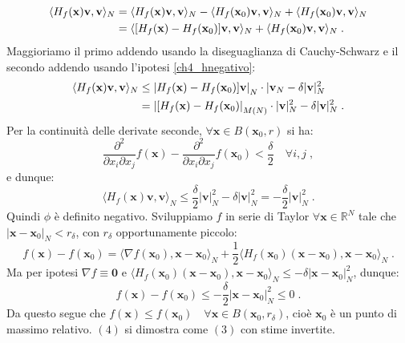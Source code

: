 \documentclass[a4paper,12pt]{report}
\theoremstyle{plain}
\theoremstyle{definition}
\theoremstyle{remark}
\numberwithin{equation}{section}
\begin{document}
\begin{align}
\langle H_f(\mathbf{x})\mathbf{v},\mathbf{v}\rangle_N &= \langle H_f(\mathbf{x})\mathbf{v},\mathbf{v}\rangle_N-\langle H_f(\mathbf{x}_0)\mathbf{v},\mathbf{v}\rangle_N+\langle H_f(\mathbf{x}_0)\mathbf{v},\mathbf{v}\rangle_N \notag \\
&=\langle [H_f(\mathbf{x})-H_f(\mathbf{x}_0)]\mathbf{v},\mathbf{v}\rangle_N+\langle H_f(\mathbf{x}_0)\mathbf{v},\mathbf{v}\rangle_N\;.
\end{align}
Maggioriamo il primo addendo usando la diseguaglianza di Cauchy-Schwarz e il secondo addendo usando l'ipotesi \eqref{ch4_hnegativo}:
\begin{align}
\langle H_f(\mathbf{x})\mathbf{v},\mathbf{v}\rangle_N &\le \left|H_f(\mathbf{x})-H_f(\mathbf{x}_0)]\mathbf{v}\right|_N\cdot |\mathbf{v}_N-\delta|\mathbf{v}|_N^2 \notag \\
&= \left|[H_f(\mathbf{x})-H_f(\mathbf{x}_0)\right|_{M(N)}\cdot |\mathbf{v}|_N^2-\delta|\mathbf{v}|_N^2\;.
\end{align}
Per la continuità delle derivate seconde, $\forall \mathbf{x} \in B(\mathbf{x}_0,r)$ si ha:
\begin{equation}
\frac{\partial^2}{\partial x_i\partial x_j} f(\mathbf{x})-\frac{\partial^2}{\partial x_i\partial x_j}f(\mathbf{x}_0) < \frac{\delta}{2}
\quad \forall i,j\;,
\end{equation}
e dunque:
\begin{equation}
\langle H_f(\mathbf{x})\mathbf{v},\mathbf{v}\rangle_N\le \frac{\delta}{2}|\mathbf{v}|_N^2 - \delta |\mathbf{v}|_N^2=-\frac{\delta}{2}|\mathbf{v}|_N^2\;.
\end{equation}
Quindi $\phi$ è definito negativo. Sviluppiamo $f$ in serie di Taylor $\forall \mathbf{x} \in \mathbb{R}^N$ tale che $|\mathbf{x}-\mathbf{x}_0|_N<r_{\delta}$, con $r_{\delta}$ opportunamente piccolo:
\begin{equation}
f(\mathbf{x})-f(\mathbf{x}_0)=\langle \nabla f(\mathbf{x}_0),\mathbf{x}-\mathbf{x}_0\rangle_N+\frac{1}{2}\langle H_f(\mathbf{x}_0)(\mathbf{x}-\mathbf{x}_0),\mathbf{x}-\mathbf{x}_0\rangle_N\;.
\end{equation}
Ma per ipotesi $\nabla f\equiv \mathbf{0}$ e $\langle H_f(\mathbf{x}_0)(\mathbf{x}-\mathbf{x}_0),\mathbf{x}-\mathbf{x}_0\rangle_N \le 
-\delta |\mathbf{x}-\mathbf{x}_0|_N^2$, dunque:
\begin{equation}
f(\mathbf{x})-f(\mathbf{x}_0) \le -\frac{\delta}{2}|\mathbf{x}-\mathbf{x}_0|_N^2 \le 0\;.
\end{equation}
Da questo segue che $f(\mathbf{x})\le f(\mathbf{x}_0) \quad \forall \mathbf{x} \in B(\mathbf{x}_0,r_{\delta})$, cioè $\mathbf{x}_0$ è un 
punto di massimo relativo.
\endproof
$(4)$ si dimostra come $(3)$ con stime invertite.
\end{document}
